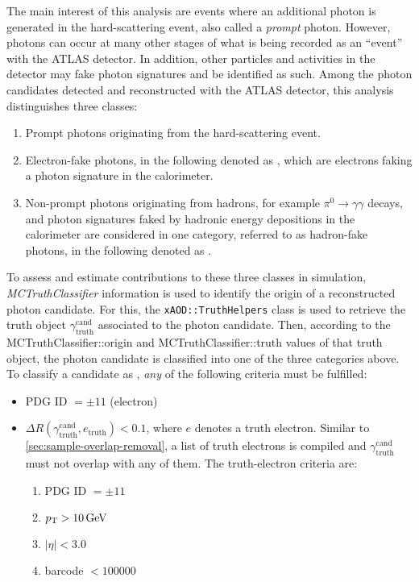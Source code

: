 The main interest of this analysis are \ttbar events where an additional photon is generated in the hard-scattering event, also called a \emph{prompt} photon.
However, photons can occur at many other stages of what is being recorded as an \enquote{event} with the ATLAS detector.
In addition, other particles and activities in the detector may fake photon signatures and be identified as such.
Among the photon candidates detected and reconstructed with the ATLAS detector, this analysis distinguishes three classes:
%
\begin{enumerate}
\item Prompt photons originating from the hard-scattering event.
\item Electron-fake photons, in the following denoted as \emph{\efakes}, which are electrons faking a photon signature in the calorimeter.
\item Non-prompt photons originating from hadrons, for example $\pi^0 \to \gamma\gamma$ decays, and photon signatures faked by hadronic energy depositions in the calorimeter are considered in one category, referred to as hadron-fake photons, in the following denoted as \emph{\hfakes}.
\end{enumerate}
%
To assess and estimate contributions to these three classes in simulation, \emph{MCTruthClassifier} information is used to identify the origin of a reconstructed photon candidate.
For this, the \texttt{xAOD::TruthHelpers} class is used to retrieve the truth object $\gamma_{\mathrm{truth}}^{\mathrm{cand}}$ associated to the photon candidate.
Then, according to the MCTruthClassifier::origin and MCTruthClassifier::truth values of that truth object, the photon candidate is classified into one of the three categories above.
To classify a candidate as \efake, \emph{any} of the following criteria must be fulfilled:
%
\begin{itemize}
\item PDG ID $= \pm 11$ (electron)
\item $\Delta R (\gamma_{\mathrm{truth}}^{\mathrm{cand}}, e_{\mathrm{truth}}) < 0.1$, where $e$ denotes a truth electron.
  Similar to \cref{sec:sample-overlap-removal}, a list of truth electrons is compiled and $\gamma_{\mathrm{truth}}^{\mathrm{cand}}$ must not overlap with any of them.
The truth-electron criteria are:
  \begin{enumerate}
  \item PDG ID $= \pm 11$
  \item $\pT > \SI{10}{\GeV}$
  \item $|\eta| < 3.0$
  \item barcode $< \num{100000}$
  \end{enumerate}
\end{itemize}
